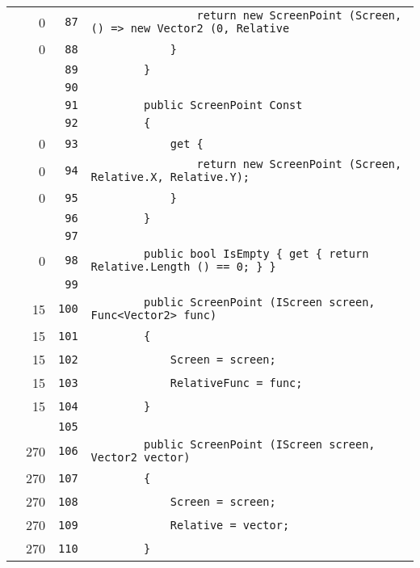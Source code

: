 \documentclass[a4paper,10pt]{article}
\begin{document}
\begin{longtable}[l]{lrrl}
\cellcolor{red} & 0 & \verb~87~ & \verb~                return new ScreenPoint (Screen, () => new Vector2 (0, Relative~\\
\cellcolor{red} & 0 & \verb~88~ & \verb~            }~\\
\cellcolor{gray} &  & \verb~89~ & \verb~        }~\\
\cellcolor{gray} &  & \verb~90~ & \verb~~\\
\cellcolor{gray} &  & \verb~91~ & \verb~        public ScreenPoint Const~\\
\cellcolor{gray} &  & \verb~92~ & \verb~        {~\\
\cellcolor{red} & 0 & \verb~93~ & \verb~            get {~\\
\cellcolor{red} & 0 & \verb~94~ & \verb~                return new ScreenPoint (Screen, Relative.X, Relative.Y);~\\
\cellcolor{red} & 0 & \verb~95~ & \verb~            }~\\
\cellcolor{gray} &  & \verb~96~ & \verb~        }~\\
\cellcolor{gray} &  & \verb~97~ & \verb~~\\
\cellcolor{red} & 0 & \verb~98~ & \verb~        public bool IsEmpty { get { return Relative.Length () == 0; } }~\\
\cellcolor{gray} &  & \verb~99~ & \verb~~\\
\cellcolor{green} & 15 & \verb~100~ & \verb~        public ScreenPoint (IScreen screen, Func<Vector2> func)~\\
\cellcolor{green} & 15 & \verb~101~ & \verb~        {~\\
\cellcolor{green} & 15 & \verb~102~ & \verb~            Screen = screen;~\\
\cellcolor{green} & 15 & \verb~103~ & \verb~            RelativeFunc = func;~\\
\cellcolor{green} & 15 & \verb~104~ & \verb~        }~\\
\cellcolor{gray} &  & \verb~105~ & \verb~~\\
\cellcolor{green} & 270 & \verb~106~ & \verb~        public ScreenPoint (IScreen screen, Vector2 vector)~\\
\cellcolor{green} & 270 & \verb~107~ & \verb~        {~\\
\cellcolor{green} & 270 & \verb~108~ & \verb~            Screen = screen;~\\
\cellcolor{green} & 270 & \verb~109~ & \verb~            Relative = vector;~\\
\cellcolor{green} & 270 & \verb~110~ & \verb~        }~\\

\end{longtable}
\end{document}
